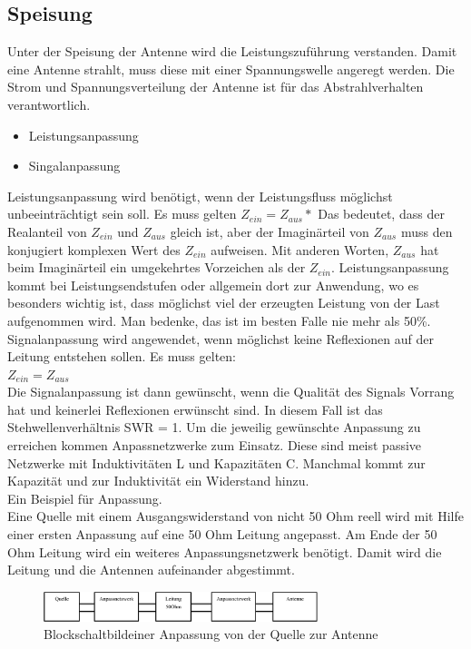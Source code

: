 \subsection{Speisung}
Unter der Speisung der Antenne wird die Leistungszuführung verstanden. Damit eine Antenne strahlt, muss diese mit einer Spannungswelle angeregt werden. Die Strom und Spannungsverteilung der Antenne ist für das Abstrahlverhalten verantwortlich. 

\begin{itemize}
\item 	Leistungsanpassung
\item 	Singalanpassung
\end{itemize}
Leistungsanpassung wird benötigt, wenn der Leistungsfluss möglichst unbeeinträchtigt sein soll. Es muss gelten
$Z_{ein}=Z_{aus}*$
Das bedeutet, dass der Realanteil von $Z_{ein}$ und $Z_{aus}$ gleich ist, aber der Imaginärteil von $Z_{aus}$ muss den konjugiert komplexen Wert des $Z_{ein}$ aufweisen. Mit anderen Worten, $Z_{aus}$ hat beim Imaginärteil ein umgekehrtes Vorzeichen als der $Z_{ein}$. Leistungsanpassung kommt bei Leistungsendstufen oder allgemein dort zur Anwendung, wo es besonders wichtig ist, dass möglichst viel der erzeugten Leistung von der Last aufgenommen wird. Man bedenke, das ist im besten Falle nie mehr als 50\%.
Signalanpassung wird angewendet, wenn möglichst keine Reflexionen auf der Leitung entstehen sollen. Es muss gelten:\\
$Z_{ein}=Z_{aus}$\\%
Die Signalanpassung ist dann gewünscht, wenn die Qualität des Signals Vorrang hat und keinerlei Reflexionen erwünscht sind. In diesem Fall ist das Stehwellenverhältnis SWR = 1.
Um die jeweilig gewünschte Anpassung zu erreichen kommen Anpassnetzwerke zum Einsatz. Diese sind meist passive Netzwerke mit Induktivitäten L und Kapazitäten C. Manchmal kommt zur Kapazität und zur Induktivität ein Widerstand hinzu.\\
Ein Beispiel für Anpassung.\\
Eine Quelle mit einem Ausgangswiderstand von nicht 50 Ohm reell wird mit Hilfe einer ersten Anpassung auf eine 50 Ohm Leitung angepasst. Am Ende der 50 Ohm Leitung wird ein weiteres Anpassungsnetzwerk benötigt. Damit wird die Leitung und die Antennen aufeinander abgestimmt.\\


\begin{figure}[!htb]
	\centering
	\includegraphics[width=8cm]{content/bilder/Anpassung.pdf}%
	\caption{Blockschaltbildeiner Anpassung von der Quelle zur Antenne}
	\label{Anpassung}
\end{figure}


